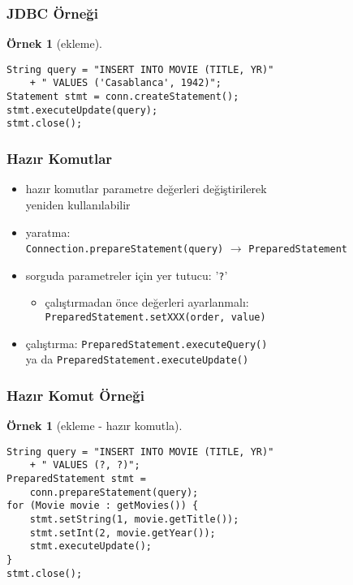 \documentclass[dvipsnames]{beamer}
\theoremstyle{definition}
\theoremstyle{example}
\newtheorem{ornek}[theorem]{Örnek}
\theoremstyle{plain}
\begin{document}
\begin{frame}[fragile]
  \frametitle{JDBC Örneği}

  \begin{ornek}[ekleme]
    \begin{lstlisting}
String query = "INSERT INTO MOVIE (TITLE, YR)"
    + " VALUES ('Casablanca', 1942)";
Statement stmt = conn.createStatement();
stmt.executeUpdate(query);
stmt.close();
    \end{lstlisting}
  \end{ornek}
\end{frame}

\begin{frame}
  \frametitle{Hazır Komutlar}

  \begin{itemize}
    \item hazır komutlar parametre değerleri değiştirilerek\\
      yeniden kullanılabilir

    \pause
    \medskip
    \item yaratma:\\
      \lstinline!Connection.prepareStatement(query)!
      $\rightarrow$ \lstinline!PreparedStatement!
    \item sorguda parametreler için yer tutucu: '\lstinline!?!'
    \begin{itemize}
      \item çalıştırmadan önce değerleri ayarlanmalı:\\
        \lstinline!PreparedStatement.setXXX(order, value)!
    \end{itemize}

    \pause
    \medskip
    \item çalıştırma: \lstinline!PreparedStatement.executeQuery()!\\
      ya da \lstinline!PreparedStatement.executeUpdate()!
  \end{itemize}
\end{frame}

\begin{frame}[fragile]
  \frametitle{Hazır Komut Örneği}

  \begin{ornek}[ekleme - hazır komutla]
    \begin{lstlisting}
String query = "INSERT INTO MOVIE (TITLE, YR)"
    + " VALUES (?, ?)";
PreparedStatement stmt =
    conn.prepareStatement(query);
for (Movie movie : getMovies()) {
    stmt.setString(1, movie.getTitle());
    stmt.setInt(2, movie.getYear());
    stmt.executeUpdate();
}
stmt.close();
    \end{lstlisting}
  \end{ornek}
\end{frame}
\end{document}
